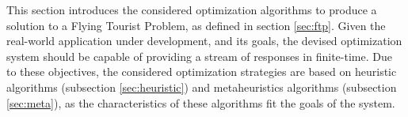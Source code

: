 This section introduces the considered optimization algorithms to produce a solution to a Flying Tourist Problem, as defined in section \ref{sec:ftp}. Given the real-world application under development, and its goals, the devised optimization system should be capable of providing a stream of responses in finite-time. Due to these objectives, the considered optimization strategies are based on heuristic algorithms (subsection \ref{sec:heuristic}) and metaheuristics algorithms (subsection \ref{sec:meta}), as the characteristics of these algorithms fit the goals of the system.


